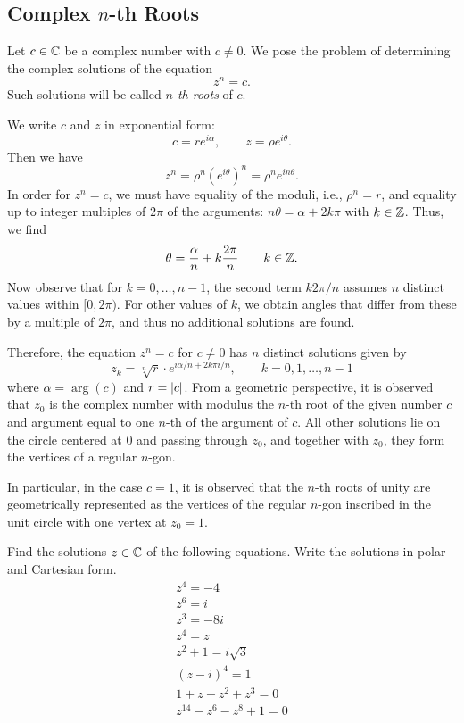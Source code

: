 \subsection{Complex $n$-th Roots}

Let $c\in {\mathbb C}$ be a complex number with $c\neq 0$. We pose the problem of
determining the complex solutions of the equation
\[
  z^n = c.
\]
Such solutions will be called \emph{$n$-th roots}%
%
 of $c$.

We write $c$ and $z$ in exponential form:
\[
  c = r e^{i\alpha}, \qquad
  z = \rho e^{i\theta}.
\]
Then we have
\[
  z^n = \rho^n (e^{i\theta})^n = \rho^n e^{i n \theta}.
\]
In order for $z^n = c$, we must have equality of the moduli, i.e., $\rho^n = r$,
and equality up to integer multiples of $2\pi$ of the arguments: $n \theta =
\alpha + 2 k \pi$ with $k\in {\mathbb Z}$. Thus, we find
\[
  \theta = \frac{\alpha}{n} + k\frac{2\pi}{n}
\qquad k \in {\mathbb Z}.
\]
Now observe that for $k=0,\dots, n-1$, the second term $k 2\pi /n$ assumes $n$
distinct values within $[0,2\pi)$. For other values of $k$, we obtain angles
that differ from these by a multiple of $2\pi$, and thus no additional solutions
are found.

Therefore, the equation $z^n = c$ for $c\neq 0$ has $n$ distinct solutions given
by
\[
z_k = \sqrt[n]{r} \cdot e^{i\alpha/n + 2k\pi i /n},
\qquad k=0,1, \dots, n-1
\]
where $\alpha = \arg(c)$ and $r = {\left|c\right|}$. From a geometric perspective, it is
observed that $z_0$ is the complex number with modulus the $n$-th root of the
given number $c$ and argument equal to one $n$-th of the argument of $c$. All
other solutions lie on the circle centered at $0$ and passing through $z_0$, and
together with $z_0$, they form the vertices of a regular $n$-gon.

In particular, in the case $c=1$, it is observed that the $n$-th roots of unity
are geometrically represented as the vertices of the regular $n$-gon inscribed
in the unit circle with one vertex at $z_0=1$.

\begin{exercise}
Find the solutions $z \in {\mathbb C}$ of the following equations. Write the solutions
in polar and Cartesian form.
\begin{gather*}
   z^4 = -4 \\
   z^6 = i\\
   z^3 = -8i \\
   z^4 = z\\
   z^2 + 1 = i\sqrt{3} \\
   (z-i)^4 = 1\\
   1 + z + z^2 + z^3 = 0\\
   z^{14} - z^6 - z^8 + 1 = 0
\end{gather*}
\end{exercise}